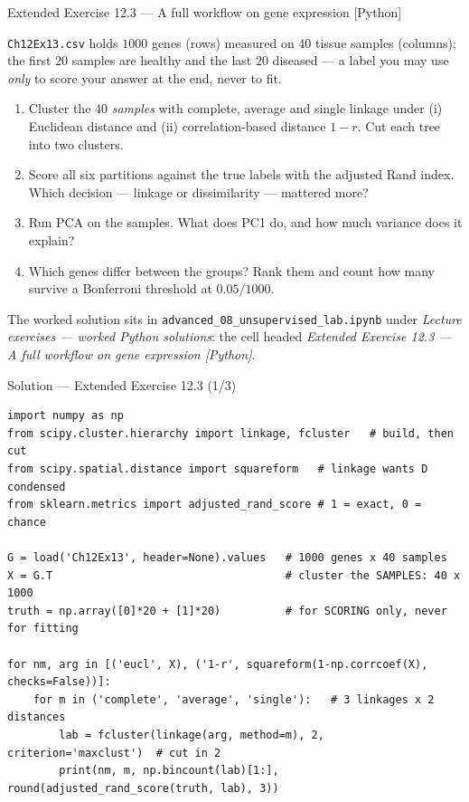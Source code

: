 \documentclass[aspectratio=169,11pt]{beamer}
\begin{document}
\begin{frame}{Extended Exercise 12.3 --- A full workflow on gene expression [Python]}
  \footnotesize
\begin{longexercise}
  \texttt{Ch12Ex13.csv} holds $1000$ genes (rows) measured on $40$ tissue samples
  (columns); the first $20$ samples are healthy and the last $20$ diseased --- a label you
  may use \emph{only} to score your answer at the end, never to fit.
  \begin{enumerate}
    \item Cluster the $40$ \emph{samples} with complete, average and single linkage under
          (i) Euclidean distance and (ii) correlation-based distance $1-r$. Cut each tree
          into two clusters.
    \item Score all six partitions against the true labels with the adjusted Rand index.
          Which decision --- linkage or dissimilarity --- mattered more?
    \item Run PCA on the samples. What does PC1 do, and how much variance does it explain?
    \item Which genes differ between the groups? Rank them and count how many survive a
          Bonferroni threshold at $0.05/1000$.
  \end{enumerate}
\end{longexercise}
\begin{labnote}
  The worked solution sits in \texttt{advanced\_08\_unsupervised\_lab.ipynb} under
  \emph{Lecture exercises --- worked Python solutions}: the cell headed
  \emph{Extended Exercise 12.3 --- A full workflow on gene expression [Python]}.
\end{labnote}
\end{frame}

\begin{frame}[fragile]{Solution --- Extended Exercise 12.3 (1/3)}
\begin{solutionbox}
\begin{lstlisting}[basicstyle=\ttfamily\scriptsize]
import numpy as np
from scipy.cluster.hierarchy import linkage, fcluster   # build, then cut
from scipy.spatial.distance import squareform   # linkage wants D condensed
from sklearn.metrics import adjusted_rand_score # 1 = exact, 0 = chance

G = load('Ch12Ex13', header=None).values   # 1000 genes x 40 samples
X = G.T                                    # cluster the SAMPLES: 40 x 1000
truth = np.array([0]*20 + [1]*20)          # for SCORING only, never for fitting

for nm, arg in [('eucl', X), ('1-r', squareform(1-np.corrcoef(X), checks=False))]:
    for m in ('complete', 'average', 'single'):   # 3 linkages x 2 distances
        lab = fcluster(linkage(arg, method=m), 2, criterion='maxclust')  # cut in 2
        print(nm, m, np.bincount(lab)[1:], round(adjusted_rand_score(truth, lab), 3))
\end{lstlisting}
\end{solutionbox}
\end{frame}
\end{document}
